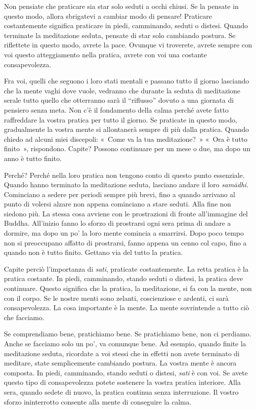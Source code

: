 Non pensiate che praticare sia star solo seduti a occhi chiusi. Se la
pensate in questo modo, allora sbrigatevi a cambiar modo di pensare!
Praticare costantemente significa praticare in piedi, camminando, seduti
o distesi. Quando terminate la meditazione seduta, pensate di star solo
cambiando postura. Se riflettete in questo modo, avrete la pace. Ovunque
vi troverete, avrete sempre con voi questo atteggiamento nella pratica,
avrete con voi una costante consapevolezza.

Fra voi, quelli che seguono i loro stati mentali e passano tutto il
giorno lasciando che la mente vaghi dove vuole, vedranno che durante la
seduta di meditazione serale tutto quello che otterranno sarà il
``riflusso'' dovuto a una giornata di pensiero senza meta. Non c'è il
fondamento della calma perché avete fatto raffreddare la vostra pratica
per tutto il giorno. Se praticate in questo modo, gradualmente la vostra
mente si allontanerà sempre di più dalla pratica. Quando chiedo ad
alcuni miei discepoli: «~Come va la tua meditazione?~» «~Ora è tutto
finito~», rispondono. Capite? Possono continuare per un mese o due, ma
dopo un anno è tutto finito.

Perché? Perché nella loro pratica non tengono conto di questo punto
essenziale. Quando hanno terminato la meditazione seduta, lasciano
andare il loro \emph{samādhi}. Cominciano a sedere per periodi sempre
più brevi, fino a quando arrivano al punto di volersi alzare non appena
cominciano a stare seduti. Alla fine non siedono più. La stessa cosa
avviene con le prostrazioni di fronte all'immagine del Buddha.
All'inizio fanno lo sforzo di prostrarsi ogni sera prima di andare a
dormire, ma dopo un po' la loro mente comincia a smarrirsi. Dopo poco
tempo non si preoccupano affatto di prostrarsi, fanno appena un cenno
col capo, fino a quando non è tutto finito. Gettano via del tutto la
pratica.

Capite perciò l'importanza di \emph{sati}, praticate costantemente. La
retta pratica è la pratica costante. In piedi, camminando, stando seduti
o distesi, la pratica deve continuare. Questo significa che la pratica,
la meditazione, si fa con la mente, non con il corpo. Se le nostre menti
sono zelanti, coscienziose e ardenti, ci sarà consapevolezza. La cosa
importante è la mente. La mente sovrintende a tutto ciò che facciamo.

Se comprendiamo bene, pratichiamo bene. Se pratichiamo bene, non ci
perdiamo. Anche se facciamo solo un po', va comunque bene. Ad esempio,
quando finite la meditazione seduta, ricordate a voi stessi che in
effetti non avete terminato di meditare, state semplicemente cambiando
postura. La vostra mente è ancora composta. In piedi, camminando, stando
seduti o distesi, \emph{sati} è con voi. Se avete questo tipo di
consapevolezza potete sostenere la vostra pratica interiore. Alla sera,
quando sedete di nuovo, la pratica continua senza interruzione. Il
vostro sforzo ininterrotto consente alla mente di conseguire la calma.

